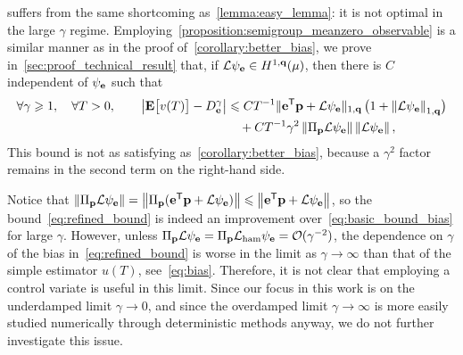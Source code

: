 \documentclass[11pt,a4paper]{article}
\begin{document}
 suffers from the same shortcoming as~\cref{lemma:easy_lemma}:
it is not optimal in the large $\gamma$ regime.
Employing~\cref{proposition:semigroup_meanzero_observable} is a similar manner as in the proof of~\cref{corollary:better_bias},
we prove in~\cref{sec:proof_technical_result} that,
if $\mathcal L \psi_{\boldsymbol{\mathbf e}} \in H^{1,\boldsymbol{\mathbf q}}(\mu)$,
then there is $C$ independent of $\psi_{\boldsymbol{\mathbf e}}$ such that
\begin{align}
    \notag
    \forall \gamma \geq 1, \quad
    \forall T > 0, \qquad
    \abs{\expect \bigl[ v(T) \bigr] - D_{\vect e}^{\gamma}}
        &\leq C T^{-1}
        \norm*{\vect e^\t \vect p +  \mathcal L \psi_{\vect e}}[1,\vect q] \, \bigl(1 + \norm{\mathcal L \psi_{\vect e}}[1,\vect q] \bigr) \\
        \label{eq:refined_bound}
        &\quad + C T^{-1} \gamma^2 \norm{\Pi_{\vect p} \mathcal L \psi_{\vect e}} \norm{\mathcal L \psi_{\vect e}},
\end{align}
This bound is not as satisfying as~\cref{corollary:better_bias},
because a $\gamma^2$ factor remains in the second term on the right-hand side.

    Notice that $\norm{\Pi_{\vect p} \mathcal L \psi_{\vect e}} = \norm{\Pi_{\vect p} (\vect e^\t \vect p + \mathcal L \psi_{\vect e})} \leq \norm{\vect e^\t \vect p + \mathcal L \psi_{\vect e}}$,
    so the bound~\eqref{eq:refined_bound} is indeed an improvement over~\eqref{eq:basic_bound_bias} for large $\gamma$.
    However,
    unless $\Pi_{\boldsymbol{\mathbf p}} \mathcal L \psi_{\boldsymbol{\mathbf e}} = \Pi_{\boldsymbol{\mathbf p}} \mathcal L_{\rm ham} \psi_{\boldsymbol{\mathbf e}} = \mathcal O(\gamma^{-2})$,
    the dependence on $\gamma$ of the bias in~\eqref{eq:refined_bound} is worse in the limit as $\gamma \to \infty$
    than that of the simple estimator $u(T)$, see~\eqref{eq:bias}.
    Therefore, it is not clear that employing a control variate is useful in this limit.
    Since our focus in this work is on the underdamped limit $\gamma \to 0$,
    and since the overdamped limit $\gamma \to \infty$ is more easily studied numerically through deterministic methods anyway,
    we do not further investigate this issue.
\end{document}
